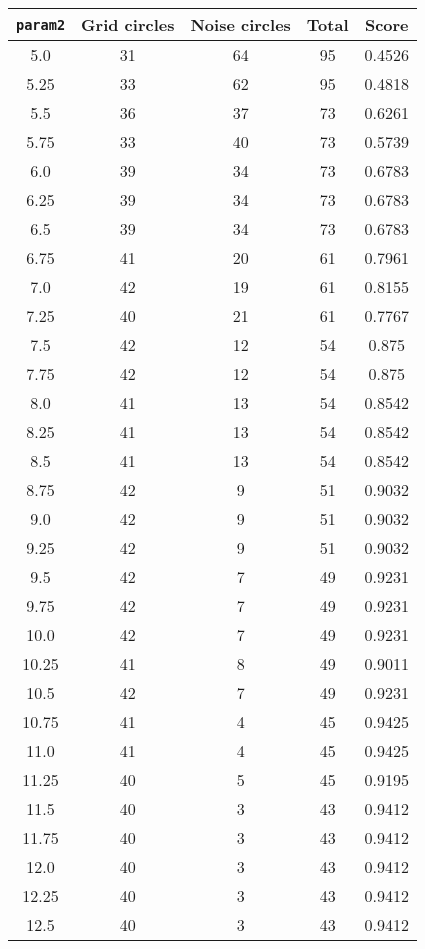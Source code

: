 \documentclass[letterpaper, 12pt]{article}
\begin{document}
\begin{longtable}{|c|c|c|c|c|}
\hline
\textbf{\texttt{param2}} & \textbf{Grid circles} & \textbf{Noise circles} & \textbf{Total} & \textbf{Score} \\
\hline
5.0 & 31 & 64 & 95 & 0.4526 \\
\hline
5.25 & 33 & 62 & 95 & 0.4818 \\
\hline
5.5 & 36 & 37 & 73 & 0.6261 \\
\hline
5.75 & 33 & 40 & 73 & 0.5739 \\
\hline
6.0 & 39 & 34 & 73 & 0.6783 \\
\hline
6.25 & 39 & 34 & 73 & 0.6783 \\
\hline
6.5 & 39 & 34 & 73 & 0.6783 \\
\hline
6.75 & 41 & 20 & 61 & 0.7961 \\
\hline
7.0 & 42 & 19 & 61 & 0.8155 \\
\hline
7.25 & 40 & 21 & 61 & 0.7767 \\
\hline
7.5 & 42 & 12 & 54 & 0.875 \\
\hline
7.75 & 42 & 12 & 54 & 0.875 \\
\hline
8.0 & 41 & 13 & 54 & 0.8542 \\
\hline
8.25 & 41 & 13 & 54 & 0.8542 \\
\hline
8.5 & 41 & 13 & 54 & 0.8542 \\
\hline
8.75 & 42 & 9 & 51 & 0.9032 \\
\hline
9.0 & 42 & 9 & 51 & 0.9032 \\
\hline
9.25 & 42 & 9 & 51 & 0.9032 \\
\hline
9.5 & 42 & 7 & 49 & 0.9231 \\
\hline
9.75 & 42 & 7 & 49 & 0.9231 \\
\hline
10.0 & 42 & 7 & 49 & 0.9231 \\
\hline
10.25 & 41 & 8 & 49 & 0.9011 \\
\hline
10.5 & 42 & 7 & 49 & 0.9231 \\
\hline
10.75 & 41 & 4 & 45 & 0.9425 \\
\hline
11.0 & 41 & 4 & 45 & 0.9425 \\
\hline
11.25 & 40 & 5 & 45 & 0.9195 \\
\hline
11.5 & 40 & 3 & 43 & 0.9412 \\
\hline
11.75 & 40 & 3 & 43 & 0.9412 \\
\hline
12.0 & 40 & 3 & 43 & 0.9412 \\
\hline
12.25 & 40 & 3 & 43 & 0.9412 \\
\hline
12.5 & 40 & 3 & 43 & 0.9412 \\

\end{longtable}
\end{document}
